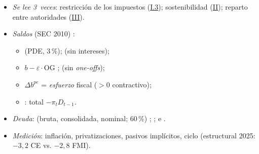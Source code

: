 \documentclass{article}
\begin{document}
\begin{columnas}
\begin{itemize}
\begin{itemize}
  \item \emph{Se lee 3~veces}: restricción de los impuestos (\hyperref[rep:I.3]{I.3}); sostenibilidad (\hyperref[rep:II]{II}); reparto entre autoridades (\hyperref[rep:III]{III}).
  \end{itemize}
\end{itemize}
\begin{itemize}
\item \emph{Saldos} (SEC 2010)  :
  \begin{itemize}
  \item {} (PDE, 3\,\%);  (sin intereses);
  \item {} $b-\varepsilon\cdot\mathrm{OG}$ ;  (sin \emph{one-offs});
  \item $\Delta b^{pe}$ = \emph{esfuerzo} fiscal ($>0$ contractivo);
  \item {}: total $-\pi_tD_{t-1}$.
  \end{itemize}
\item \emph{Deuda}:  (bruta, consolidada, nominal; 60\,\%) ; ;  e .
\item \emph{Medición}: inflación, privatizaciones, pasivos implícitos, ciclo (estructural 2025: $-3{,}2$ CE vs. $-2{,}8$ FMI).
\end{itemize}


\end{columnas}
\end{document}
